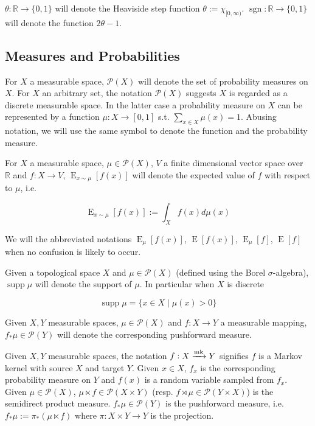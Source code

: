 \documentclass{article}
\numberwithin{equation}{section}
\theoremstyle{definition}
\theoremstyle{plain}
\newcommand{\Bool}{\{0,1\}}
\DeclareMathOperator{\Sgn}{sgn}
\DeclareMathOperator{\Supp}{supp}
\DeclareMathOperator{\E}{E}
\newcommand{\Reals}{\mathbb{R}}
\begin{document}
$\theta: \Reals \rightarrow \Bool$ will denote the Heaviside step function $\theta:=\chi_{[0,\infty)}$. ${\Sgn: \Reals \rightarrow \Bool}$ will denote the function $2 \theta - 1$.

\subsection{Measures and Probabilities}

For ${X}$ a measurable space, ${\mathcal{P}(X)}$ will denote the set of probability measures on ${X}$. For ${X}$ an arbitrary set, the notation ${\mathcal{P}(X)}$ suggests ${X}$ is regarded as a discrete measurable space. In the latter case a probability measure on $X$ can be represented by a function $\mu: X \rightarrow [0,1]$ s.t. $\sum_{x \in X} \mu(x) = 1$. Abusing notation, we will use the same symbol to denote the function and the probability measure.

For $X$ a measurable space, $\mu \in \mathcal{P}(X)$, $V$ a finite dimensional vector space over $\Reals$ and $f: X \rightarrow V$, $\E_{x \sim \mu}[f(x)]$ will denote the expected value of $f$ with respect to $\mu$, i.e. 

\[\E_{x \sim \mu}[f(x)] := \int_X f(x) d\mu(x)\]

We will the abbreviated notations $\E_\mu[f(x)]$, $\E[f(x)]$, $\E_\mu[f]$, $\E[f]$ when no confusion is likely to occur.

Given a topological space $X$ and $\mu \in \mathcal{P}(X)$ (defined using the Borel ${\sigma}$-algebra), $\Supp \mu$ will denote the support of $\mu$. In particular when $X$ is discrete

\[\Supp \mu = \{x \in X \mid \mu(x) > 0\}\]

Given $X,Y$ measurable spaces, $\mu \in \mathcal{P}(X)$ and $f: X \rightarrow Y$ a measurable mapping, $f_*\mu \in \mathcal{P}(Y)$ will denote the corresponding pushforward measure.

Given $X,Y$ measurable spaces, the notation $f: X \xrightarrow{\textnormal{mk}} Y$ signifies $f$ is a Markov kernel with source $X$ and target $Y$. Given $x \in X$, $f_x$ is the corresponding probability measure on $Y$ and $f(x)$ is a random variable sampled from $f_x$. Given $\mu \in \mathcal{P}(X)$, $\mu \ltimes f \in \mathcal{P}(X \times Y)$ (resp. $f \rtimes \mu \in \mathcal{P}(Y \times X)$) is the semidirect product measure. $f_*\mu \in \mathcal{P}(Y)$ is the pushforward measure, i.e. $f_*\mu:=\pi_*(\mu \ltimes f)$ where $\pi: X \times Y \rightarrow Y$ is the projection.
\end{document}
